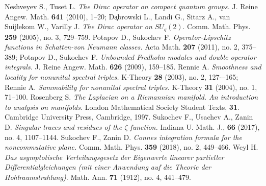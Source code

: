 \documentclass[12pt]{article}
\begin{document}
\begin{thebibliography}{99}
 Neshveyev S., Tuset L. {\it The Dirac operator on compact quantum groups.} J. Reine Angew. Math. {\bf 641} (2010), 1--20; Da̧browski L., Landi G., Sitarz A., van Suijlekom W., Varilly J. {\it The Dirac operator on $SU_q(2).$} Comm. Math. Phys. {\bf 259} (2005), no. 3, 729--759.
 Potapov D., Sukochev F. {\it Operator-Lipschitz functions in Schatten-von Neumann classes.} Acta Math. {\bf 207} (2011), no. 2, 375--389; Potapov D., Sukochev F. {\it Unbounded Fredholm modules and double operator integrals.} J. Reine Angew. Math. {\bf 626} (2009), 159--185.
 Rennie A. {\it Smoothness and locality for nonunital spectral triples.} K-Theory {\bf 28} (2003), no. 2, 127-–165; Rennie A. {\it Summability for nonunital spectral triples. } K-Theory {\bf 31} (2004), no. 1, 71--100.
 Rosenberg S. {\it The Laplacian on a Riemannian manifold. An introduction to analysis on manifolds.} London Mathematical Society Student Texts, {\bf 31}. Cambridge University Press, Cambridge, 1997.
 Sukochev F., Usachev A., Zanin D. {\it Singular traces and residues of the $\zeta$-function.} Indiana U. Math. J., {\bf 66} (2017), no. 4, 1107--1144.
 Sukochev F., Zanin D. {\it Connes integration formula for the noncommutative plane.} Comm. Math. Phys. {\bf 359} (2018), no. 2, 449--466.
 Weyl H. {\it Das asymptotische Verteilungsgesetz der Eigenwerte linearer partieller Differentialgleichungen (mit einer Anwendung auf die Theorie der Hohlraumstrahlung).} Math. Ann. {\bf 71} (1912), no. 4, 441--479. 

\end{thebibliography}
\end{document}
